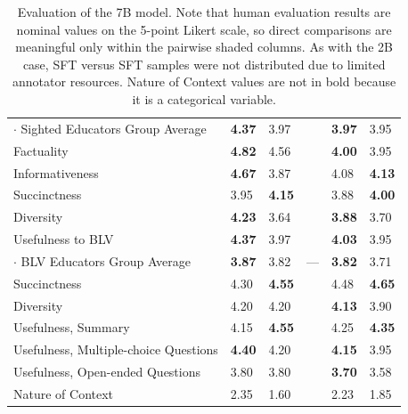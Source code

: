 \begin{landscape}
\begin{table}
\begin{tabular}{l>{\columncolor{gray!15}}l>{\columncolor{gray!15}}lll>{\columncolor{gray!15}}l>{\columncolor{gray!15}}l}
        $\cdot$ Sighted Educators Group Average & \textbf{4.37} & 3.97 & & & \textbf{3.97} & 3.95 \\
        Factuality                              & \textbf{4.82} & 4.56 & & & \textbf{4.00} & 3.95 \\
        Informativeness                         & \textbf{4.67} & 3.87 & & & 4.08 & \textbf{4.13} \\
        Succinctness                            & 3.95 & \textbf{4.15} & & & 3.88 & \textbf{4.00} \\
        Diversity                               & \textbf{4.23} & 3.64 & & & \textbf{3.88} & 3.70 \\
        Usefulness to BLV                       & \textbf{4.37} & 3.97 & & & \textbf{4.03} & 3.95 \\

        $\cdot$ BLV Educators Group Average     & \textbf{3.87} & 3.82 & \multicolumn{2}{c}{---} & \textbf{3.82} & 3.71 \\
        Succinctness                            & 4.30 & \textbf{4.55} & & & 4.48 & \textbf{4.65} \\
        Diversity                               & 4.20 & 4.20 & & & \textbf{4.13} & 3.90 \\
        Usefulness, Summary                     & 4.15 & \textbf{4.55} & & & 4.25 & \textbf{4.35} \\
        Usefulness, Multiple-choice Questions   & \textbf{4.40} & 4.20 & & & \textbf{4.15} & 3.95 \\
        Usefulness, Open-ended Questions        & 3.80 & 3.80 & & & \textbf{3.70} & 3.58 \\
        Nature of Context                       & 2.35 & 1.60 & & & 2.23 & 1.85 \\
                                    
    \bottomrule
    \end{tabular}
\caption{Evaluation of the 7B model. Note that human evaluation results are nominal values on the 5-point Likert scale, so direct comparisons are meaningful only within the pairwise shaded columns. As with the 2B case, SFT versus SFT samples were not distributed due to limited annotator resources. Nature of Context values are not in bold because it is a categorical variable.}\label{tab:big7B}
\end{table}
\end{landscape}




